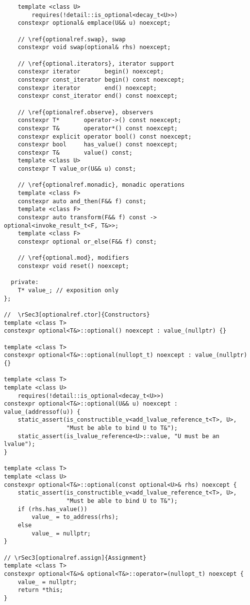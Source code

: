 \documentclass[a4paper,10pt,oneside,openany,final,article]{memoir}
\begin{document}
\begin{verbatim}
    template <class U>
        requires(!detail::is_optional<decay_t<U>>)
    constexpr optional& emplace(U&& u) noexcept;

    // \ref{optionalref.swap}, swap
    constexpr void swap(optional& rhs) noexcept;

    // \ref{optional.iterators}, iterator support
    constexpr iterator       begin() noexcept;
    constexpr const_iterator begin() const noexcept;
    constexpr iterator       end() noexcept;
    constexpr const_iterator end() const noexcept;

    // \ref{optionalref.observe}, observers
    constexpr T*       operator->() const noexcept;
    constexpr T&       operator*() const noexcept;
    constexpr explicit operator bool() const noexcept;
    constexpr bool     has_value() const noexcept;
    constexpr T&       value() const;
    template <class U>
    constexpr T value_or(U&& u) const;

    // \ref{optionalref.monadic}, monadic operations
    template <class F>
    constexpr auto and_then(F&& f) const;
    template <class F>
    constexpr auto transform(F&& f) const -> optional<invoke_result_t<F, T&>>;
    template <class F>
    constexpr optional or_else(F&& f) const;

    // \ref{optional.mod}, modifiers
    constexpr void reset() noexcept;

  private:
    T* value_; // exposition only
};

//  \rSec3[optionalref.ctor]{Constructors}
template <class T>
constexpr optional<T&>::optional() noexcept : value_(nullptr) {}

template <class T>
constexpr optional<T&>::optional(nullopt_t) noexcept : value_(nullptr) {}

template <class T>
template <class U>
    requires(!detail::is_optional<decay_t<U>>)
constexpr optional<T&>::optional(U&& u) noexcept : value_(addressof(u)) {
    static_assert(is_constructible_v<add_lvalue_reference_t<T>, U>,
                  "Must be able to bind U to T&");
    static_assert(is_lvalue_reference<U>::value, "U must be an lvalue");
}

template <class T>
template <class U>
constexpr optional<T&>::optional(const optional<U>& rhs) noexcept {
    static_assert(is_constructible_v<add_lvalue_reference_t<T>, U>,
                  "Must be able to bind U to T&");
    if (rhs.has_value())
        value_ = to_address(rhs);
    else
        value_ = nullptr;
}

// \rSec3[optionalref.assign]{Assignment}
template <class T>
constexpr optional<T&>& optional<T&>::operator=(nullopt_t) noexcept {
    value_ = nullptr;
    return *this;
}


\end{verbatim}
\end{document}

